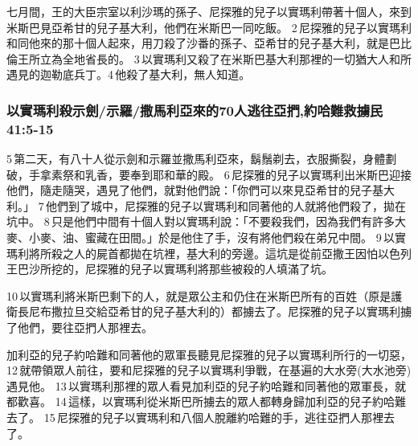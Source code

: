 七月間，王的大臣宗室以利沙瑪的孫子、尼探雅的兒子以實瑪利帶著十個人，來到米斯巴見亞希甘的兒子基大利，他們在米斯巴一同吃飯。 2 尼探雅的兒子以實瑪利和同他來的那十個人起來，用刀殺了沙番的孫子、亞希甘的兒子基大利，就是巴比倫王所立為全地省長的。 3 以實瑪利又殺了在米斯巴基大利那裡的一切猶大人和所遇見的迦勒底兵丁。4 他殺了基大利，無人知道。

\subsubsection{以實瑪利殺示劍/示羅/撒馬利亞來的70人逃往亞捫,約哈難救擄民 41:5-15}
 5 第二天，有八十人從示劍和示羅並撒馬利亞來，鬍鬚剃去，衣服撕裂，身體劃破，手拿素祭和乳香，要奉到耶和華的殿。 6 尼探雅的兒子以實瑪利出米斯巴迎接他們，隨走隨哭，遇見了他們，就對他們說：「你們可以來見亞希甘的兒子基大利。」 7 他們到了城中，尼探雅的兒子以實瑪利和同著他的人就將他們殺了，拋在坑中。 8 只是他們中間有十個人對以實瑪利說：「不要殺我們，因為我們有許多大麥、小麥、油、蜜藏在田間。」於是他住了手，沒有將他們殺在弟兄中間。 9 以實瑪利將所殺之人的屍首都拋在坑裡，基大利的旁邊。這坑是從前亞撒王因怕以色列王巴沙所挖的，尼探雅的兒子以實瑪利將那些被殺的人填滿了坑。 

10 以實瑪利將米斯巴剩下的人，就是眾公主和仍住在米斯巴所有的百姓（原是護衛長尼布撒拉旦交給亞希甘的兒子基大利的）都擄去了。尼探雅的兒子以實瑪利擄了他們，要往亞捫人那裡去。

加利亞的兒子約哈難和同著他的眾軍長聽見尼探雅的兒子以實瑪利所行的一切惡， 12 就帶領眾人前往，要和尼探雅的兒子以實瑪利爭戰，在基遍的大水旁(大水池旁)遇見他。 13 以實瑪利那裡的眾人看見加利亞的兒子約哈難和同著他的眾軍長，就都歡喜。 14 這樣，以實瑪利從米斯巴所擄去的眾人都轉身歸加利亞的兒子約哈難去了。 15 尼探雅的兒子以實瑪利和八個人脫離約哈難的手，逃往亞捫人那裡去了。

